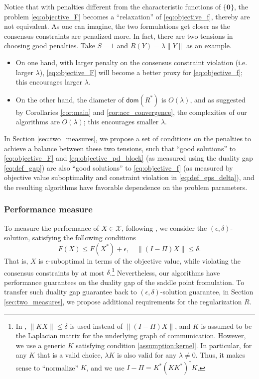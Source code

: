 \documentclass[10pt]{article}
\newcommand{\mc}{\mathcal}
\newcommand{\mb}{\mathbf}
\newcommand{\domain}{\mathsf{dom}}
\begin{document}
Notice that with penalties different from the characteristic functions of $\{\mb 0\}$, the problem \eqref{eq:objective_F} becomes a ``relaxation'' of \eqref{eq:objective_f}, thereby are not equivalent. As one can imagine, the two formulations get closer as the consensus constraints are penalized more. In fact, there are two tensions in choosing good penalties. Take $S=1$ and $R(Y) = \lambda\|Y\|$ as an example. 
\begin{itemize}
    \item On one hand, with larger penalty on the consensus constraint violation (i.e. larger $\lambda$), \eqref{eq:objective_F} will become a better proxy for \eqref{eq:objective_f}; this encourages larger $\lambda$.
    \item On the other hand, the diameter of $\domain(R^*)$ is $O(\lambda)$, and as suggested by Corollaries \ref{cor:main} and \ref{cor:acc_convergence}, the complexities of our algorithms are $O(\lambda)$; this encourages smaller $\lambda$. 
\end{itemize}
In Section \ref{sec:two_measures}, we propose a set of conditions on the penalties to achieve a balance between these two tensions, such that ``good solutions'' to \eqref{eq:objective_F} and \eqref{eq:objective_pd_block} (as measured using the duality gap \eqref{eq:def_gap}) are also ``good solutions'' to \eqref{eq:objective_f} (as measured by objective value suboptimality and constraint violation in \eqref{eq:def_eps_delta}), and the resulting algorithms have favorable dependence on the problem parameters. 





\subsubsection{Performance measure} 
To measure the performance of $X\in {\mc X}$, following \cite{lan_communication-efficient_2020}, we consider the $(\epsilon,\delta)$-solution, satisfying the following conditions
\begin{equation}\label{eq:def_eps_delta}
    F(X) \leq F(X^*)+\epsilon,\quad \|(I-\Pi)X\|\leq \delta.
\end{equation}
That is, $X$ is $\epsilon$-suboptimal in terms of the objective value, while violating the consensus constraints by at most $\delta$.\footnote{In \cite{lan_communication-efficient_2020}, $\|KX\|\leq \delta$ is used instead of $\|(I-\Pi)X\|$, and $K$ is assumed to be the Laplacian matrix for the underlying graph of communication. However, we use a generic $K$ satisfying condition \ref{assumption:kernel}. In particular, for any $K$ that is a valid choice, $\lambda K$ is also valid for any $\lambda\neq 0$. Thus, it makes sense to ``normalize'' $K$, and we use $I-\Pi = K^*(KK^*)^{\dagger}K$.} Nevertheless, our algorithms have performance guarantees on the duality gap of the saddle point fromulation. To transfer such duality gap guarantee back to $(\epsilon,\delta)$-solution guarantee, in Section \ref{sec:two_measures}, we propose additional requirements for the regularization $R$. 
\end{document}
